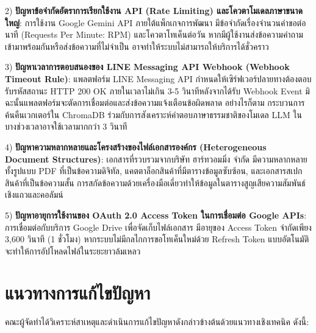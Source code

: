 \begin{mycustomitem}
\item 2) \textbf{ปัญหาข้อจำกัดอัตราการเรียกใช้งาน API (Rate Limiting) และโควตาโมเดลภาษาขนาดใหญ่}: การใช้งาน Google Gemini API ภายใต้แพ็กเกจการพัฒนา มีข้อจำกัดเรื่องจำนวนคำขอต่อนาที (Requests Per Minute: RPM) และโควตาโทเค็นต่อวัน หากมีผู้ใช้งานส่งข้อความคำถามเข้ามาพร้อมกันหรือส่งข้อความที่ไม่จำเป็น อาจทำให้ระบบไม่สามารถให้บริการได้ชั่วคราว
\end{mycustomitem}

\begin{mycustomitem}
\item 3) \textbf{ปัญหาเวลาการตอบสนองของ LINE Messaging API Webhook (Webhook Timeout Rule)}: แพลตฟอร์ม LINE Messaging API กำหนดให้เซิร์ฟเวอร์ปลายทางต้องตอบรับรหัสสถานะ HTTP 200 OK ภายในเวลาไม่เกิน 3-5 วินาทีหลังจากได้รับ Webhook Event มิฉะนั้นแพลตฟอร์มจะตัดการเชื่อมต่อและส่งข้อความแจ้งเตือนข้อผิดพลาด อย่างไรก็ตาม กระบวนการค้นคืนเวกเตอร์ใน ChromaDB ร่วมกับการสังเคราะห์คำตอบภาษาธรรมชาติของโมเดล LLM ในบางช่วงเวลาอาจใช้เวลามากกว่า 3 วินาที
\end{mycustomitem}

\begin{mycustomitem}
\item 4) \textbf{ปัญหาความหลากหลายและโครงสร้างของไฟล์เอกสารองค์กร (Heterogeneous Document Structures)}: เอกสารที่รวบรวมจากบริษัท ฮาร์ทวอมมิ่ง จำกัด มีความหลากหลายทั้งรูปแบบ PDF ที่เป็นข้อความดิจิทัล, แคตตาล็อกสินค้าที่มีตารางข้อมูลซับซ้อน, และเอกสารสเปกสินค้าที่เป็นข้อความสั้น การสกัดข้อความด้วยเครื่องมือเดี่ยวทำให้ข้อมูลในตารางสูญเสียความสัมพันธ์เชิงแถวและคอลัมน์
\end{mycustomitem}

\begin{mycustomitem}
\item 5) \textbf{ปัญหาอายุการใช้งานของ OAuth 2.0 Access Token ในการเชื่อมต่อ Google APIs}: การเชื่อมต่อกับบริการ Google Drive เพื่อจัดเก็บไฟล์เอกสาร มีอายุของ Access Token จำกัดเพียง 3,600 วินาที (1 ชั่วโมง) หากระบบไม่มีกลไกการขอโทเค็นใหม่ด้วย Refresh Token แบบอัตโนมัติ จะทำให้การอัปโหลดไฟล์ในระยะยาวล้มเหลว
\end{mycustomitem}

\section{แนวทางการแก้ไขปัญหา}
\hspace*{1.3em}
คณะผู้จัดทำได้วิเคราะห์สาเหตุและดำเนินการแก้ไขปัญหาดังกล่าวข้างต้นด้วยแนวทางเชิงเทคนิค ดังนี้:

